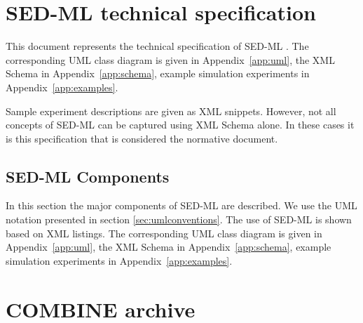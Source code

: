\documentclass[pdftex,rgb,dvipsnames,svgnames,hyperref,table]{report}
\begin{document}

\tableofcontents
\newpage


\chapter{SED-ML technical specification}
\label{chp:specification}

This document represents the technical specification of SED-ML \currentLV. The corresponding UML class diagram is given in Appendix~\ref{app:uml}, the XML Schema in Appendix~\ref{app:schema}, example simulation experiments in Appendix~\ref{app:examples}.

Sample experiment descriptions are given as XML snippets. However, not all concepts of SED-ML can be captured using XML Schema alone. In these cases it is this specification that is considered the normative document. 








\section{SED-ML Components}
In this section the major components of SED-ML are described. We use the UML notation presented in section \ref{sec:umlconventions}. The use of SED-ML is shown based on XML listings. The corresponding UML class diagram is given in Appendix~\ref{app:uml}, the XML Schema in Appendix~\ref{app:schema}, example simulation experiments in Appendix~\ref{app:examples}.









\chapter{COMBINE archive}
\label{app:archive}
\end{document}
